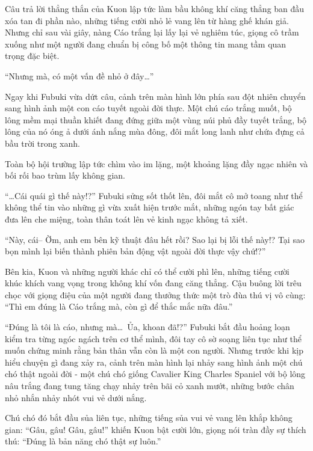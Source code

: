 \documentclass[../main.tex]{subfiles}
\begin{document}
Câu trả lời thẳng thắn của Kuon lập tức làm bầu không khí căng thẳng ban đầu xóa tan đi phần nào, những tiếng cười nhỏ lẻ vang lên từ hàng ghế khán giả. Nhưng chỉ sau vài giây, nàng Cáo trắng lại lấy lại vẻ nghiêm túc, giọng cô trầm xuống như một người đang chuẩn bị công bố một thông tin mang tầm quan trọng đặc biệt.

``Nhưng mà, có một vấn đề nhỏ ở đây\dots''

Ngay khi Fubuki vừa dứt câu, cảnh trên màn hình lớn phía sau đột nhiên chuyển sang hình ảnh một con cáo tuyết ngoài đời thực. Một chú cáo trắng muốt, bộ lông mềm mại thuần khiết đang đứng giữa một vùng núi phủ đầy tuyết trắng, bộ lông của nó óng ả dưới ánh nắng mùa đông, đôi mắt long lanh như chứa đựng cả bầu trời trong xanh.


Toàn bộ hội trường lập tức chìm vào im lặng, một khoảng lặng đầy ngạc nhiên và bối rối bao trùm lấy không gian.

``\dots Cái quái gì thế này!?'' Fubuki sửng sốt thốt lên, đôi mắt cô mở toang như thể không thể tin vào những gì vừa xuất hiện trước mắt, những ngón tay bất giác đưa lên che miệng, toàn thân toát lên vẻ kinh ngạc không tả xiết.

``Này, cái-- Ờm, anh em bên kỹ thuật đâu hết rồi? Sao lại bị lỗi thế này!? Tại sao bọn mình lại biến thành phiên bản động vật ngoài đời thực vậy chứ!?''

Bên kia, Kuon và những người khác chỉ có thể cười phì lên, những tiếng cười khúc khích vang vọng trong không khí vốn đang căng thẳng. Cậu buông lời trêu chọc với giọng điệu của một người đang thưởng thức một trò đùa thú vị vô cùng: ``Thì em đúng là Cáo trắng mà, còn gì để thắc mắc nữa đâu.''

``Đúng là tôi là cáo, nhưng mà\dots\ Ủa, khoan đã!?'' Fubuki bắt đầu hoảng loạn kiểm tra từng ngóc ngách trên cơ thể mình, đôi tay cô sờ soạng liên tục như thể muốn chứng minh rằng bản thân vẫn còn là một con người. Nhưng trước khi kịp hiểu chuyện gì đang xảy ra, cảnh trên màn hình lại nhảy sang hình ảnh một chú chó thật ngoài đời - một chú chó giống Cavalier King Charles Spaniel với bộ lông nâu trắng đang tung tăng chạy nhảy trên bãi cỏ xanh mướt, những bước chân nhỏ nhắn nhảy nhót vui vẻ dưới nắng.


Chú chó đó bắt đầu sủa liên tục, những tiếng sủa vui vẻ vang lên khắp không gian: ``Gâu, gâu! Gâu, gâu!'' khiến Kuon bật cười lớn, giọng nói tràn đầy sự thích thú: ``Đúng là bản năng chó thật sự luôn.''
\end{document}
